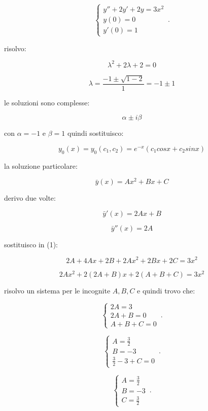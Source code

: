 \documentclass[11pt]{article}
\begin{document}
    \begin{equation}
        \begin{cases}
            y''+ 2y'+ 2y= 3x^{2}\\
            y(0) = 0\\
            y'(0) = 1
        \end{cases}\,.
    \end{equation}


risolvo:

\[
    \lambda^{2}+2 \lambda+2 =0
\]

\[
    \lambda= \frac{-1 \pm \sqrt{1-2}}{1}= -1 \pm 1
\]

le soluzioni sono complesse:

\[
    \alpha \pm  i \beta
\]

con $\alpha = -1$ e $\beta = 1$ quindi sostituisco:

\[
    y_0(x) = y_0(c_1,c_2) = e ^{-x}(c_1cosx + c_2 sinx)
\]

la soluzione particolare:

\[
    \bar{y} (x) = A x^{2}+Bx+C
\]

derivo due volte:

\[
    \bar{y} '(x) = 2Ax + B
\]

\[
    \bar{y} ''(x) = 2A
\]

sostituisco in (1):

\[
    2A + 4Ax + 2B + 2Ax^{2}+2Bx + 2C = 3x^{2}
\]

\[
    2Ax^{2} + 2(2A+B) x + 2(A+B+C) = 3x^{2}
\]

risolvo un sistema per le incognite $A,B,C$ e quindi trovo che:

    \begin{equation}
        \begin{cases}
            2A = 3\\
            2A + B = 0\\
            A+B+C= 0
        \end{cases}\,.
    \end{equation}

    \begin{equation}
        \begin{cases}
            A=\frac{3}{2}\\
            B=-3\\
            \frac{3}{2}-3+C=0
        \end{cases}\,.
    \end{equation}

    \begin{equation}
        \begin{cases}
            A=\frac{3}{2}\\
            B=-3\\
            C=\frac{3}{2}
        \end{cases}\,.
    \end{equation}
\end{document}

